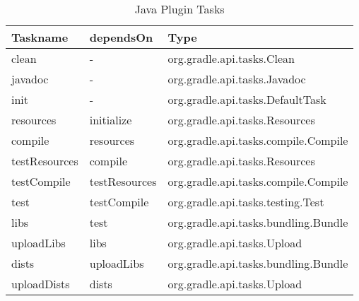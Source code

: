 \begin{table}
	\begin{center}
		\begin{tabular}{|l|l|l|} \hline
			\textbf{Taskname} & \textbf{dependsOn} & \textbf{Type} \\ \hline
			clean & - & org.gradle.api.tasks.Clean \\ \hline
			javadoc & - & org.gradle.api.tasks.Javadoc \\ \hline
			init & - & org.gradle.api.tasks.DefaultTask \\ \hline
			resources & initialize & org.gradle.api.tasks.Resources \\ \hline
			compile & resources & org.gradle.api.tasks.compile.Compile \\ \hline
			testResources & compile & org.gradle.api.tasks.Resources \\ \hline
			testCompile & testResources & org.gradle.api.tasks.compile.Compile \\ \hline
			test & testCompile & org.gradle.api.tasks.testing.Test \\ \hline
			libs & test & org.gradle.api.tasks.bundling.Bundle \\ \hline
			uploadLibs & libs & org.gradle.api.tasks.Upload \\ \hline
			dists & uploadLibs & org.gradle.api.tasks.bundling.Bundle \\ \hline
			uploadDists & dists & org.gradle.api.tasks.Upload \\ \hline
		\end{tabular}
	\end{center}
	\caption{Java Plugin Tasks}	
	\label{javatasks}
\end{table}

